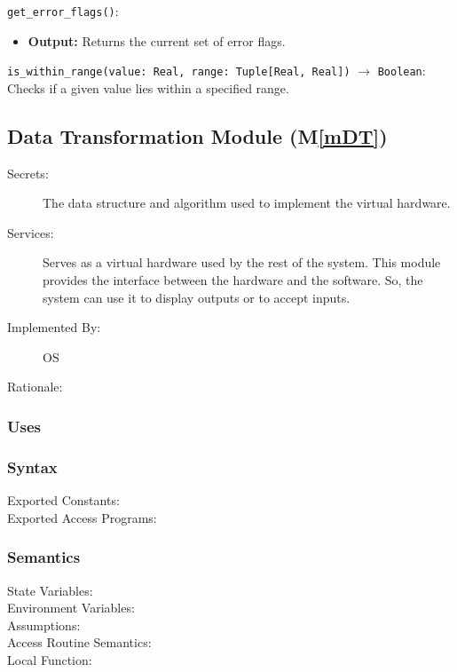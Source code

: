 \documentclass[12pt, titlepage]{article}
\newcommand{\mref}[1]{M\ref{#1}}
\begin{document}
\begin{description}
\begin{description}
\begin{description}
  \lstinline{get_error_flags()}:
  \item
  \begin{itemize}
    \item \textbf{Output:} Returns the current set of error flags.
  \end{itemize}

  \item[Local Function:]
  \item
  \lstinline{is_within_range(value: Real, range: Tuple[Real, Real])} $\to$ \lstinline{Boolean}:\\
  Checks if a given value lies within a specified range.
\end{description}

\subsection{Data Transformation Module (\mref{mDT})}
\begin{description}
  \item[Secrets:]The data structure and algorithm used to implement the virtual
    hardware.
  \item[Services:]Serves as a virtual hardware used by the rest of the
    system. This module provides the interface between the hardware and the
    software. So, the system can use it to display outputs or to accept inputs.
  \item[Implemented By:] OS
  \item[Rationale:] 
\end{description}

\subsubsection{Uses}

\subsubsection{Syntax}
\begin{description}
  \item[Exported Constants:] 
  \item[Exported Access Programs:] 
\end{description}

\subsubsection{Semantics}
\begin{description}
  \item[State Variables:]
  \item[Environment Variables:]  
  \item[Assumptions:] 
  \item[Access Routine Semantics:] 
  \item[Local Function:] 
\end{description}


\end{description}
\end{description}
\end{document}
